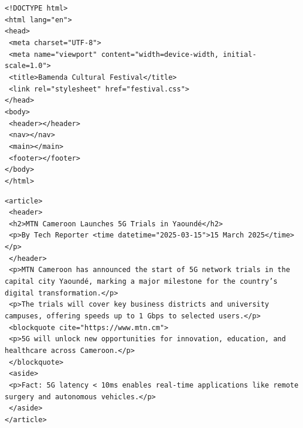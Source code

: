 \documentclass[11pt]{article}
\begin{document}
\begin{corrige}[Exercise 1]
\texttt{<!DOCTYPE html>}\\
\texttt{<html lang="en">}\\
\texttt{<head>}\\
\texttt{  <meta charset="UTF-8">}\\
\texttt{  <meta name="viewport" content="width=device-width, initial-scale=1.0">}\\
\texttt{  <title>Bamenda Cultural Festival</title>}\\
\texttt{  <link rel="stylesheet" href="festival.css">}\\
\texttt{</head>}\\
\texttt{<body>}\\
\texttt{  <header></header>}\\
\texttt{  <nav></nav>}\\
\texttt{  <main></main>}\\
\texttt{  <footer></footer>}\\
\texttt{</body>}\\
\texttt{</html>}
\end{corrige}

\begin{corrige}[Exercise 2]
\texttt{<article>}\\
\texttt{  <header>}\\
\texttt{    <h2>MTN Cameroon Launches 5G Trials in Yaoundé</h2>}\\
\texttt{    <p>By Tech Reporter \textemdash <time datetime="2025-03-15">15 March 2025</time></p>}\\
\texttt{  </header>}\\
\texttt{  <p>MTN Cameroon has announced the start of 5G network trials in the capital city Yaoundé, marking a major milestone for the country's digital transformation.</p>}\\
\texttt{  <p>The trials will cover key business districts and university campuses, offering speeds up to 1 Gbps to selected users.</p>}\\
\texttt{  <blockquote cite="https://www.mtn.cm">}\\
\texttt{    <p>5G will unlock new opportunities for innovation, education, and healthcare across Cameroon.</p>}\\
\texttt{  </blockquote>}\\
\texttt{  <aside>}\\
\texttt{    <p>Fact: 5G latency < 10ms enables real-time applications like remote surgery and autonomous vehicles.</p>}\\
\texttt{  </aside>}\\
\texttt{</article>}
\end{corrige}
\end{document}
